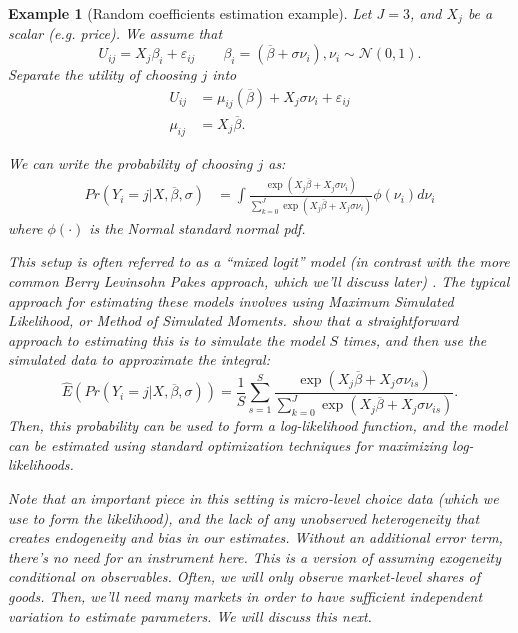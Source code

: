 \documentclass{tufte-handout}
\theoremstyle{break}
\newtheorem{exmp}{Example}
\begin{document}
\begin{boxD}
  \begin{exmp}[Random coefficients estimation example]
    \label{example:random_coefficients}
    Let $J = 3$, and $X_{j}$ be a scalar (e.g. price).  We assume that
    \begin{equation}
      U_{ij} = X_{j}\beta_{i} + \varepsilon_{ij} \qquad \beta_{i} = (\overline{\beta} + \sigma \nu_{i}), \nu_{i}  \sim \mathcal{N}(0, 1). 
    \end{equation}
      Separate the utility of choosing $j$ into 
      \begin{align}
        U_{ij} &= \mu_{ij}(\overline{\beta})  + X_{j} \sigma \nu_{i} + \varepsilon_{ij}\\
        \mu_{ij} &=  X_{j}\overline{\beta}. 
      \end{align} 

      We can write the probability of choosing $j$ as:
    \begin{align}
      Pr(Y_{i} = j | X, \overline{\beta}, \sigma ) &= \int \frac{\exp(X_{j}\overline{\beta} + X_{j} \sigma \nu_{i})}{\sum_{k=0}^{J}\exp(X_{j}\overline{\beta} + X_{j} \sigma \nu_{i})} \phi(\nu_{i})d\nu_{i}
    \end{align}
    where $\phi(\cdot )$ is the Normal standard normal pdf. 

    This setup is often referred to as a ``mixed logit'' model (in contrast with the more common Berry Levinsohn Pakes approach, which we'll discuss later) \citep{mcfadden2000mixed}. The typical approach for estimating these models involves using Maximum Simulated Likelihood, or Method of Simulated Moments. \citet{mcfadden2000mixed} show that a straightforward approach to estimating this is to simulate the model $S$ times, and then use the simulated data to approximate the integral:
    \begin{equation}
      \hat{E}(Pr(Y_{i} = j | X, \overline{\beta}, \sigma ))= \frac{1}{S}\sum_{s=1}^{S}\frac{\exp(X_{j}\overline{\beta} + X_{j} \sigma \nu_{is})}{\sum_{k=0}^{J}\exp(X_{j}\overline{\beta} + X_{j} \sigma \nu_{is})}.
    \end{equation}
    Then, this probability can be used to form a log-likelihood function, and the model can be estimated using standard optimization techniques for maximizing log-likelihoods.

    Note that an important piece in this setting is micro-level choice data (which we use to form the likelihood), and the lack of any unobserved heterogeneity that creates endogeneity and bias in our estimates. Without an additional error term, there's no need for an instrument here. This is a version of assuming exogeneity conditional on observables. Often, we will only observe \emph{market-level} shares of goods. Then, we'll need many markets in order to have sufficient independent variation to estimate parameters. We will discuss this next.
  \end{exmp}
\end{boxD}
      
\end{document}
